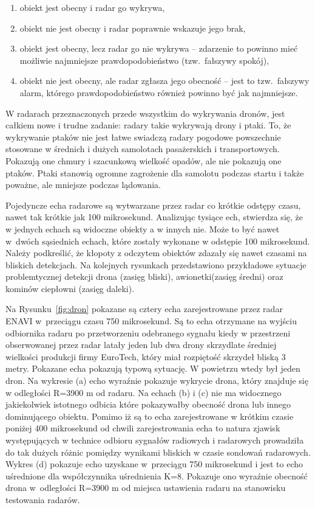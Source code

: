 \begin{enumerate}
  \item obiekt jest obecny i radar go wykrywa,
  \item obiekt nie jest obecny i radar poprawnie wskazuje jego brak,
  \item obiekt jest obecny, lecz radar go nie wykrywa -- zdarzenie to powinno mieć możliwie najmniejsze prawdopodobieństwo (tzw.\ fałszywy spokój),
  \item obiekt nie jest obecny, ale radar zgłasza jego obecność -- jest to tzw.\ fałszywy alarm, którego prawdopodobieństwo również powinno być jak najmniejsze.
\end{enumerate}

W radarach przeznaczonych przede wszystkim do wykrywania dronów, jest całkiem nowe i trudne zadanie: radary takie wykrywają drony i ptaki. To, że wykrywanie ptaków nie jest łatwe swiadczą radary pogodowe powszechnie stosowane w średnich i dużych samolotach pasażerskich i transportowych. Pokazują one chmury i szacunkową wielkość opadów, ale nie pokazują one ptaków. Ptaki stanowią ogromne zagrożenie dla samolotu podczas  startu i także poważne, ale mniejsze podczas lądowania. 

Pojedyncze echa radarowe są wytwarzane przez radar co krótkie odstępy czasu, nawet tak krótkie jak 100 mikrosekund. Analizując tysiące ech, stwierdza się, że w jednych echach są widoczne obiekty a w innych nie. Może to być nawet w~dwóch sąsiednich echach, które zostały wykonane w odstępie 100 mikrosekund.
Należy podkreślić, że kłopoty z odczytem obiektów zdazały się nawet czasami na bliskich detekcjach. Na kolejnych rysunkach przedstawiono przykładowe sytuacje problemtycznej detekcji drona (zasięg bliski), awionetki(zasięg średni) oraz kominów ciepłowni (zasięg daleki).

Na Rysunku~\ref{fig:dron} pokazane są cztery echa zarejestrowane przez radar ENAVI w~przeciągu czasu 750 mikrosekund. Są to echa otrzymane na wyjściu odbiornika radaru po przetworzeniu odebranego sygnału kiedy w przestrzeni obserwowanej przez radar latały jeden lub dwa drony skrzydlate średniej wielkości produkcji firmy EuroTech, który miał rozpiętość skrzydeł bliską 3 metry. Pokazane echa pokazują typową sytuację. W powietrzu wtedy był jeden dron. Na wykresie (a) echo wyraźnie pokazuje wykrycie drona, który znajduje się w odległości R=3900 m od radaru. Na echach (b) i (c) nie ma widocznego jakiekolwiek istotnego odbicia które pokazywałby obecność drona lub innego dominującego obiektu. Pomimo iż są to echa zarejestrowane w krótkim czasie poniżej 400 mikrosekund od chwili zarejestrowania echa to natura zjawisk występujących w technice odbioru sygnałów radiowych i radarowych prowadziła do tak dużych różnic pomiędzy wynikami bliskich w czasie sondowań radarowych. Wykres (d) pokazuje echo uzyskane w~przeciągu 750 mikrosekund i jest to echo uśrednione dla współczynnika uśrednienia K=8. Pokazuje ono wyraźnie obecność drona w~odległości R=3900 m od miejsca ustawienia radaru na stanowisku testowania radarów.


